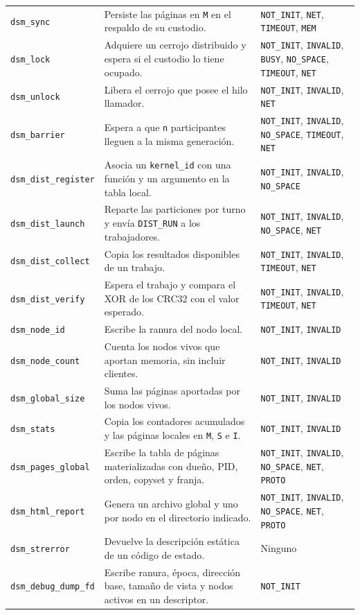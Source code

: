 {\begin{xltabular}{\linewidth}{@{}l Y P{3.2cm}@{}}
\texttt{dsm\_sync} & Persiste las páginas en \texttt{M} en el respaldo de su custodio. & \texttt{NOT\_INIT}, \texttt{NET}, \texttt{TIMEOUT}, \texttt{MEM} \\
\texttt{dsm\_lock} & Adquiere un cerrojo distribuido y espera si el custodio lo tiene ocupado. & \texttt{NOT\_INIT}, \texttt{INVALID}, \texttt{BUSY}, \texttt{NO\_SPACE}, \texttt{TIMEOUT}, \texttt{NET} \\
\texttt{dsm\_unlock} & Libera el cerrojo que posee el hilo llamador. & \texttt{NOT\_INIT}, \texttt{INVALID}, \texttt{NET} \\
\texttt{dsm\_barrier} & Espera a que \texttt{n} participantes lleguen a la misma generación. & \texttt{NOT\_INIT}, \texttt{INVALID}, \texttt{NO\_SPACE}, \texttt{TIMEOUT}, \texttt{NET} \\
\texttt{dsm\_dist\_register} & Asocia un \texttt{kernel\_id} con una función y un argumento en la tabla local. & \texttt{NOT\_INIT}, \texttt{INVALID}, \texttt{NO\_SPACE} \\
\texttt{dsm\_dist\_launch} & Reparte las particiones por turno y envía \texttt{DIST\_RUN} a los trabajadores. & \texttt{NOT\_INIT}, \texttt{INVALID}, \texttt{NO\_SPACE}, \texttt{NET} \\
\texttt{dsm\_dist\_collect} & Copia los resultados disponibles de un trabajo. & \texttt{NOT\_INIT}, \texttt{INVALID}, \texttt{TIMEOUT}, \texttt{NET} \\
\texttt{dsm\_dist\_verify} & Espera el trabajo y compara el XOR de los CRC32 con el valor esperado. & \texttt{NOT\_INIT}, \texttt{INVALID}, \texttt{TIMEOUT}, \texttt{NET} \\
\texttt{dsm\_node\_id} & Escribe la ranura del nodo local. & \texttt{NOT\_INIT}, \texttt{INVALID} \\
\texttt{dsm\_node\_count} & Cuenta los nodos vivos que aportan memoria, sin incluir clientes. & \texttt{NOT\_INIT}, \texttt{INVALID} \\
\texttt{dsm\_global\_size} & Suma las páginas aportadas por los nodos vivos. & \texttt{NOT\_INIT}, \texttt{INVALID} \\
\texttt{dsm\_stats} & Copia los contadores acumulados y las páginas locales en \texttt{M}, \texttt{S} e \texttt{I}. & \texttt{NOT\_INIT}, \texttt{INVALID} \\
\texttt{dsm\_pages\_global} & Escribe la tabla de páginas materializadas con dueño, PID, orden, copyset y franja. & \texttt{NOT\_INIT}, \texttt{INVALID}, \texttt{NO\_SPACE}, \texttt{NET}, \texttt{PROTO} \\
\texttt{dsm\_html\_report} & Genera un archivo global y uno por nodo en el directorio indicado. & \texttt{NOT\_INIT}, \texttt{INVALID}, \texttt{NO\_SPACE}, \texttt{NET}, \texttt{PROTO} \\
\texttt{dsm\_strerror} & Devuelve la descripción estática de un código de estado. & Ninguno \\
\texttt{dsm\_debug\_dump\_fd} & Escribe ranura, época, dirección base, tamaño de vista y nodos activos en un descriptor. & \texttt{NOT\_INIT} \\
\end{xltabular}
}

